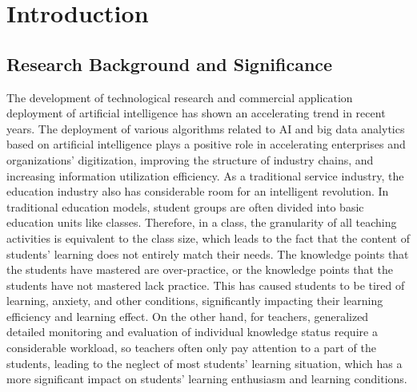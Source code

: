 
\chapter{Introduction}  %

\ifpdf
    \graphicspath{{Chapter1/Figs/Raster/}{Chapter1/Figs/PDF/}{Chapter1/Figs/}}
\else
    \graphicspath{{Chapter1/Figs/Vector/}{Chapter1/Figs/}}
\fi


\section{Research Background and Significance} %

The development of technological research and commercial application deployment of artificial intelligence has shown an accelerating trend in recent years. The deployment of various algorithms related to AI and big data analytics based on artificial intelligence plays a positive role in accelerating enterprises and organizations' digitization, improving the structure of industry chains, and increasing information utilization efficiency. As a traditional service industry, the education industry also has considerable room for an intelligent revolution. In traditional education models, student groups are often divided into basic education units like classes. Therefore, in a class, the granularity of all teaching activities is equivalent to the class size, which leads to the fact that the content of students' learning does not entirely match their needs. The knowledge points that the students have mastered are over-practice, or the knowledge points that the students have not mastered lack practice. This has caused students to be tired of learning, anxiety, and other conditions, significantly impacting their learning efficiency and learning effect. On the other hand, for teachers, generalized detailed monitoring and evaluation of individual knowledge status require a considerable workload, so teachers often only pay attention to a part of the students, leading to the neglect of most students' learning situation, which has a more significant impact on students' learning enthusiasm and learning conditions.

